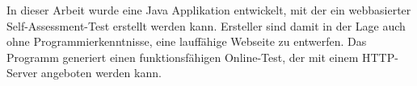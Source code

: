\label{Abstract}
In dieser Arbeit wurde eine Java Applikation entwickelt, mit der ein webbasierter Self-Assessment-Test erstellt werden kann. 
Ersteller sind damit in der Lage auch ohne Programmierkenntnisse, eine lauffähige Webseite zu entwerfen.
Das Programm generiert einen funktionsfähigen Online-Test, der mit einem HTTP-Server angeboten werden kann.
